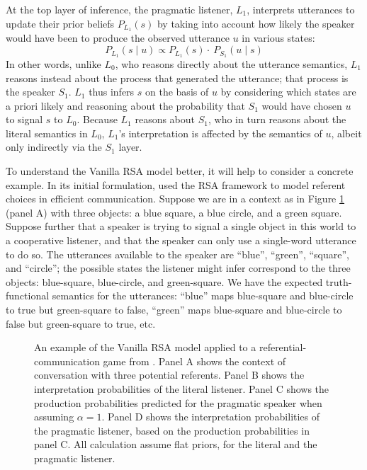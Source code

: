 \documentclass[10pt,letterpaper]{article}
\begin{document}
At the top layer of inference, the pragmatic listener, $L_1$, interprets utterances to update their prior beliefs $P_{{L_1}}(s)$ by taking into account how likely the speaker would have been to produce the observed utterance $u$ in various states:
\begin{equation} \label{L1}
P_{L_1}(s \mid u) \propto P_{L_1}(s) \cdot \ P_{S_1}(u \mid s)
\end{equation}
In other words, unlike $L_0$, who reasons directly about the utterance semantics, $L_1$ reasons instead about the process that generated the utterance; that process is the speaker $S_1$. $L_1$ thus infers $s$ on the basis of $u$ by considering which states are a priori likely and reasoning about the probability that $S_1$ would have chosen $u$ to signal $s$ to $L_0$. Because $L_1$ reasons about $S_1$, who in turn reasons about the literal semantics in $L_0$, $L_1$'s interpretation is affected by the semantics of $u$, albeit only indirectly via the $S_1$ layer.

To understand the Vanilla RSA model better, it will help to consider a concrete example.
In its initial formulation, \cite{frankgoodman2012} used the RSA framework to model referent choices in efficient communication. Suppose we are in a context as in Figure \ref{ref-game} (panel A) with three objects: a blue square, a blue circle, and a green square. Suppose further that a speaker is trying to signal a single object in this world to a cooperative listener, and that the speaker can only use a single-word utterance to do so. The utterances available to the speaker are ``blue'', ``green'', ``square'', and ``circle''; the possible states the listener might infer correspond to the three objects: blue-square, blue-circle, and green-square. We have the expected truth-functional semantics for the utterances: ``blue'' maps blue-square and blue-circle to true but green-square to false, ``green'' maps blue-square and blue-circle to false but green-square to true, etc.

\begin{figure}[h]
\centering
\caption{An example of the Vanilla RSA model applied to a referential-communication game from \cite{frankgoodman2012}. Panel A shows the context of conversation with three potential referents. Panel B shows the interpretation probabilities of the literal listener. Panel C shows the production probabilities predicted for the pragmatic speaker when assuming $\alpha = 1$. Panel D shows the interpretation probabilities of the pragmatic listener, based on the production probabilities in panel C. All calculation assume flat priors, for the literal and the pragmatic listener.}
\label{ref-game}
\end{figure}
\end{document}

